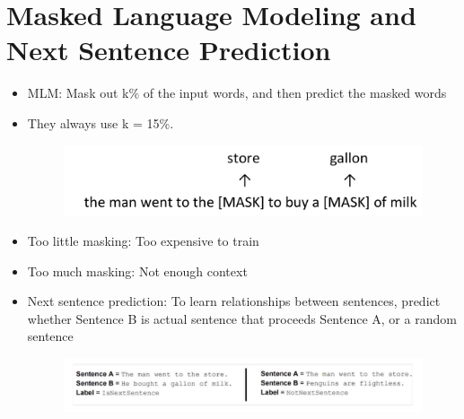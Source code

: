 \section{Masked Language Modeling and Next Sentence Prediction}
\begin{itemize}
\item MLM: Mask out k\% of the input words, and then predict the masked words
\item They always use k = 15\%.

     \begin{figure}[h]
        	\includegraphics[scale = 0.3]{pics/MLM.png}
        \end{figure}  

\item Too little masking: Too expensive to train
\item Too much masking: Not enough context

\item Next sentence prediction: To learn relationships between sentences, predict whether
Sentence B is actual sentence that proceeds Sentence A, or a random sentence

 \begin{figure}[h]
        	\includegraphics[scale = 0.23]{pics/NSP.png}
        \end{figure}  



\end{itemize}


